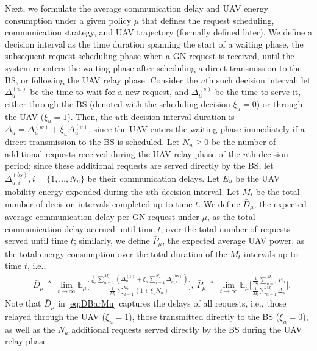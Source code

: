 \documentclass[12pt, draftcls, onecolumn]{IEEEtran}
\theoremstyle{plain}
\theoremstyle{definition}
\theoremstyle{remark}
\begin{document}
Next, we formulate the average communication delay and UAV energy consumption under a given policy $\mu$ that defines the request scheduling, communication strategy, and UAV trajectory (formally defined later). We define a decision interval as the time duration spanning the start of a {waiting} phase, the subsequent {request scheduling} phase when a GN request is received, until the system re-enters the {waiting} phase after scheduling a direct transmission to the BS, or following the {UAV relay} phase. Consider the $u$th such decision interval; let $\Delta_{u}^{(w)}$ be the time to wait for a new request, and $\Delta_{u}^{(s)}$ be the time to serve it, either through the BS (denoted with the scheduling decision $\xi_{u}{=}0$) or through the UAV ($\xi_{u}{=}1$). Then, the $u$th decision interval duration is $\Delta_{u}{=}\Delta_{u}^{(w)}{+}\xi_{u}\Delta_{u}^{(s)}$, since the UAV enters the {waiting phase} immediately if a direct transmission to the BS is scheduled. Let $N_{u}{\geq}0$ be the number of additional requests received during the UAV relay phase of the $u$th decision period; since these additional requests are served directly by the BS, let $\Delta_{u,i}^{(bs)},i=\{1,{\dots},N_{u}\}$ be their communication delays. Let $E_{u}$ be the UAV mobility energy expended during the $u$th decision interval. Let $M_{t}$ be the total number of decision intervals completed up to time $t$. We define $\bar{D}_{\mu}$, the expected average communication delay per GN request under $\mu$, as the total communication delay accrued until time $t$, over the total number of requests served until time $t$; similarly, we define $\bar{P}_{\mu}$, the expected average UAV power, as the total energy consumption over the total duration of the $M_{t}$ intervals up to time $t$, i.e.,
\begin{align}\label{eq:DBarMu}
    &\bar{D}_{\mu} \triangleq \lim_{t \rightarrow \infty} \mathbb{E}_{\mu} \Bigg[
    \frac{\frac{1}{M_t}\sum_{u = 1}^{M_t}(\Delta_u^{(s)}+\xi_u\sum_{i=1}^{N_u}\Delta_{u,i}^{(bs)})}{
    \frac{1}{M_t}\sum_{u = 1}^{M_t}(1+\xi_uN_u)
    }\Bigg],\ 	\bar{P}_{\mu} \triangleq \lim_{t \rightarrow \infty} \mathbb{E}_{\mu} \Bigg[ \frac{\frac{1}{M_t}\sum_{u = 1}^{M_t}E_u}{\frac{1}{M_t}\sum_{u = 1}^{M_t} \Delta_u}\Bigg].
\end{align}
Note that $\bar{D}_{\mu}$ in \eqref{eq:DBarMu} captures the delays of all requests, i.e., those relayed through the UAV ($\xi_{u}{=}1$), those transmitted directly to the BS ($\xi_{u}{=}0$), as well as the $N_{u}$ additional requests served directly by the BS during the UAV relay phase.
\end{document}
